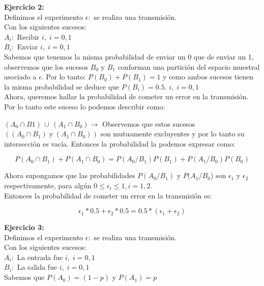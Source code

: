 \documentclass[11pt]{article}
\begin{document}
\begin{justify}
  \textbf{Ejercicio 2:} \\
  Definimos el experimento $\epsilon:$ se realiza una transmisión. \\
  Con los siguientes sucesos: \\
  $A_i:$ Recibir $i,\;i=0,1$ \\
  $B_i:$ Enviar $i,\;i=0,1$ \\
  Sabemos que tenemos la misma probabilidad de enviar un 0 que de enviar un 1, 
  observemos que los sucesos $B_0$ y $B_1$ conforman una partición del espacio
  muestral asociado a $\epsilon$. Por lo tanto: $P(B_0) + P(B_1) = 1$
  y como ambos sucesos tienen la misma probabilidad se deduce que $P(B_i) = 0.5$. 
  $i,\;i=0,1$\\
  Ahora, queremos hallar la probabilidad de cometer un error en la transmisión.
  Por lo tanto este suceso lo podemos describir como:

  $(A_0 \cap B1)\,\cup\,(A_1 \cap B_0) \rightarrow$ Observemos que estos sucesos
  $((A_0 \cap B_1) \;\text{y}\; (A_1 \cap B_0))$ son mutuamente excluyentes
  y por lo tanto su intersección es vacía. Entonces la probabilidad la podemos
  expresar como:
\end{justify}
\begin{equation*}
  P(A_0 \cap B_1) + P(A_1 \cap B_0) = P(A_0/B_1)P(B_1) + P(A_1/B_0)P(B_0)
\end{equation*}
\begin{justify}
  Ahora supongamos que las probabilidades $P(A_0/B_1)$ y $P(A_1/B_0$) son
  $\epsilon_1$ y $\epsilon_2$ respectivamente, para algún $0 \leq \epsilon_i
  \leq 1, i = 1,2$.\\
  Entonces la probabilidad de cometer un error en la transmisión es:
\end{justify}
\begin{equation*}
  \epsilon_1 * 0.5 + \epsilon_2 * 0.5 = 0.5 * (\epsilon_1 + \epsilon_2)
\end{equation*}


\begin{justify}
  \textbf{Ejercicio 3:} \\
  Definimos el experimento $\epsilon:$ se realiza una transmisión. \\
  Con los siguientes sucesos: \\
  $A_i:$ La entrada fue $i,\;i=0,1$ \\
  $B_i:$ La salida fue $i,\;i=0,1$ \\
  Sabemos que $P(A_0) = (1-p)$ y $P(A_1) = p$
\end{justify}
\end{document}
